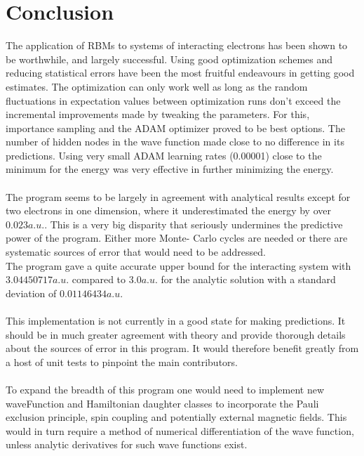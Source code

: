 \documentclass[11pt,a4paper,titlepage]{article}
\begin{document}
\section{Conclusion}
The application of RBMs to systems of interacting electrons has been shown to be worthwhile, and largely successful. Using good optimization schemes and reducing statistical errors have been the most fruitful endeavours in getting good estimates. The optimization can only work well as long as the random fluctuations in expectation values between optimization runs don't exceed the incremental improvements made by tweaking the parameters. For this, importance sampling and the ADAM optimizer proved to be best options. The number of hidden nodes in the wave function made close to no difference in its predictions. Using very small ADAM learning rates (0.00001) close to the minimum for the energy was very effective in further minimizing the energy.\\\\The program seems to be largely in agreement with analytical results except for two electrons in one dimension, where it underestimated the energy by over $0.023 a.u.$. This is a very big disparity that seriously undermines the predictive power of the program. Either more Monte- Carlo cycles are needed or there are systematic sources of error that would need to be addressed.\\The program gave a quite accurate upper bound for the interacting system with $3.04450717a.u.$ compared to $3.0a.u.$ for the analytic solution with a standard deviation of $0.01146434a.u.$\\\\This implementation is not currently in a good state for making predictions. It should be in much greater agreement with theory and provide thorough details about the sources of error in this program. It would therefore benefit greatly from a host of unit tests to pinpoint the main contributors.\\\\To expand the breadth of this program one would need to implement new waveFunction and Hamiltonian daughter classes to incorporate the Pauli exclusion principle, spin coupling and potentially external magnetic fields. This would in turn require a method of numerical differentiation of the wave function, unless analytic derivatives for such wave functions exist.
\end{document}

